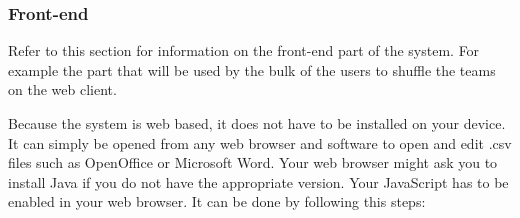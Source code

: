 \subsubsection{Front-end}
	Refer to this section for information on the front-end part of the system. For example the part that will be	used by the bulk of the users to shuffle the teams on the web client.\par
	\vspace{0.3cm}
	
Because the system is web based, it does not have to be installed on your device. It can simply be opened from any web browser and software to open and edit .csv files such as OpenOffice or Microsoft Word.
Your web browser might ask you to install Java if you do not have the appropriate version. Your JavaScript has to be enabled in your web browser. It can be done by following this steps:


